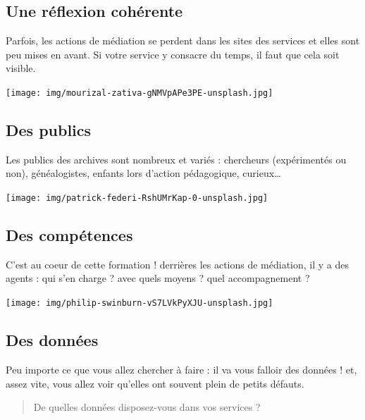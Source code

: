 \documentclass[
  letterpaper,
  DIV=11,
  numbers=noendperiod]{scrartcl}
\begin{document}
\subsection{Une réflexion
cohérente}\label{une-ruxe9flexion-cohuxe9rente}

Parfois, les actions de médiation se perdent dans les sites des services
et elles sont peu mises en avant. Si votre service y consacre du temps,
il faut que cela soit visible.

\begin{center}
\texttt{[image: img/mourizal-zativa-gNMVpAPe3PE-unsplash.jpg]}
\end{center}

\subsection{Des publics}\label{des-publics}

Les publics des archives sont nombreux et variés : chercheurs
(expérimentés ou non), généalogistes, enfants lors d'action pédagogique,
curieux\ldots{} \begin{center}
\texttt{[image: img/patrick-federi-RshUMrKap-0-unsplash.jpg]}
\end{center}

\subsection{Des compétences}\label{des-compuxe9tences}

C'est au coeur de cette formation ! derrières les actions de médiation,
il y a des agents : qui s'en charge ? avec quels moyens ? quel
accompagnement ?

\begin{center}
\texttt{[image: img/philip-swinburn-vS7LVkPyXJU-unsplash.jpg]}
\end{center}

\subsection{Des données}\label{des-donnuxe9es}

Peu importe ce que vous allez chercher à faire : il va vous falloir des
données ! et, assez vite, vous allez voir qu'elles ont souvent plein de
petits défauts.

\begin{quote}
De quelles données disposez-vous dans vos services ?
\end{quote}
\end{document}
